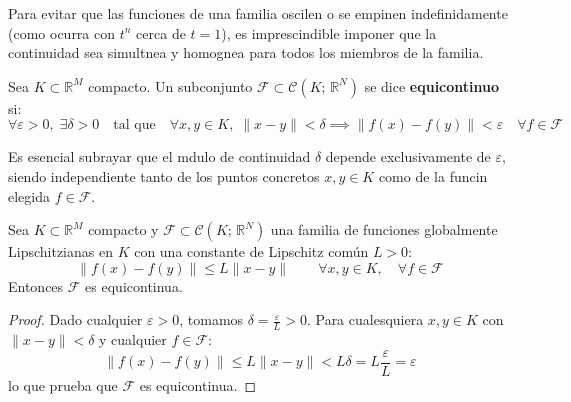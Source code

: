 Para evitar que las funciones de una familia oscilen o se empinen indefinidamente (como ocurra con $t^n$ cerca de $t = 1$), es imprescindible imponer que la continuidad sea simultnea y homognea para todos los miembros de la familia.

\begin{definicin}
    Sea $K \subset \mathbb{R}^M$ compacto. Un subconjunto $\mathcal{F} \subset \mathcal{C}(K; \, \mathbb{R}^N)$ se dice \textbf{equicontinuo} si:
    \[
        \forall \varepsilon > 0, \; \exists \delta > 0 \quad \text{tal que} \quad \forall x, y \in K, \; \|x - y\| < \delta \implies \|f(x) - f(y)\| < \varepsilon \quad \forall f \in \mathcal{F}
    \]
\end{definicin}

Es esencial subrayar que el mdulo de continuidad $\delta$ depende exclusivamente de $\varepsilon$, siendo independiente tanto de los puntos concretos $x, y \in K$ como de la funcin elegida $f \in \mathcal{F}$.

\begin{lema}
    Sea $K \subset \mathbb{R}^M$ compacto y $\mathcal{F} \subset \mathcal{C}(K; \, \mathbb{R}^N)$ una familia de funciones globalmente Lipschitzianas en $K$ con una constante de Lipschitz común $L > 0$:
    \[
        \|f(x) - f(y)\| \leq L \|x - y\| \qquad \forall x, y \in K, \quad \forall f \in \mathcal{F}
    \]
    Entonces $\mathcal{F}$ es equicontinua.
\end{lema}

\begin{proof}
    Dado cualquier $\varepsilon > 0$, tomamos $\delta = \frac{\varepsilon}{L} > 0$. Para cualesquiera $x, y \in K$ con $\|x - y\| < \delta$ y cualquier $f \in \mathcal{F}$:
    \[
        \|f(x) - f(y)\| \leq L \|x - y\| < L \delta = L \frac{\varepsilon}{L} = \varepsilon
    \]
    lo que prueba que $\mathcal{F}$ es equicontinua.
\end{proof}

